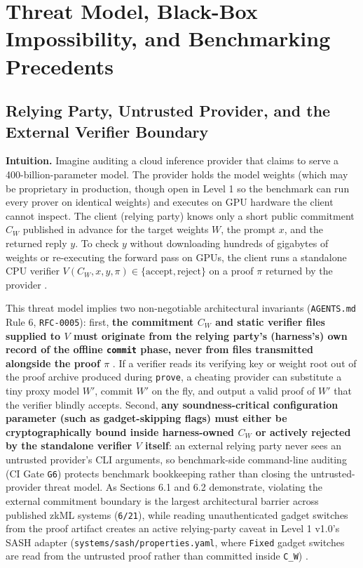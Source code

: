\documentclass[11pt,letterpaper]{article}
\begin{document}
\section{Threat Model, Black-Box Impossibility, and Benchmarking Precedents}

\subsection{Relying Party, Untrusted Provider, and the External Verifier Boundary}

\textbf{Intuition.} Imagine auditing a cloud inference provider that claims to serve a 400-billion-parameter model. The provider holds the model weights (which may be proprietary in production, though open in Level 1 so the benchmark can run every prover on identical weights) and executes on GPU hardware the client cannot inspect. The client (relying party) knows only a short public commitment $C_W$ published in advance for the target weights $W$, the prompt $x$, and the returned reply $y$. To check $y$ without downloading hundreds of gigabytes of weights or re-executing the forward pass on GPUs, the client runs a standalone CPU verifier $V(C_W, x, y, \pi) \in \{\text{accept}, \text{reject}\}$ on a proof $\pi$ returned by the provider \cite{rinberg2026flashprove,iproofs2026}.

This threat model implies two non-negotiable architectural invariants (\texttt{AGENTS.\allowbreak{}md} Rule 6, \texttt{RFC-0005}): first, \textbf{the commitment $C_W$ and static verifier files supplied to $V$ must originate from the relying party's (harness's) own record of the offline \texttt{commit} phase, never from files transmitted alongside the proof $\pi$} \cite{iproofs2026}. If a verifier reads its verifying key or weight root out of the proof archive produced during \texttt{prove}, a cheating provider can substitute a tiny proxy model $W'$, commit $W'$ on the fly, and output a valid proof of $W'$ that the verifier blindly accepts. Second, \textbf{any soundness-critical configuration parameter (such as gadget-skipping flags) must either be cryptographically bound inside harness-owned $C_W$ or actively rejected by the standalone verifier $V$ itself}: an external relying party never sees an untrusted provider's CLI arguments, so benchmark-side command-line auditing (CI Gate \texttt{G6}) protects benchmark bookkeeping rather than closing the untrusted-provider threat model. As Sections 6.1 and 6.2 demonstrate, violating the external commitment boundary is the largest architectural barrier across published zkML systems (\texttt{6/\allowbreak{}21}), while reading unauthenticated gadget switches from the proof artifact creates an active relying-party caveat in Level 1 v1.0's SASH adapter (\texttt{systems/\allowbreak{}sash/\allowbreak{}properties.\allowbreak{}yaml}, where \texttt{Fixed} gadget switches are read from the untrusted proof rather than committed inside \texttt{C\_\allowbreak{}W}) \cite{iproofs2026,sash2026}.
\end{document}
